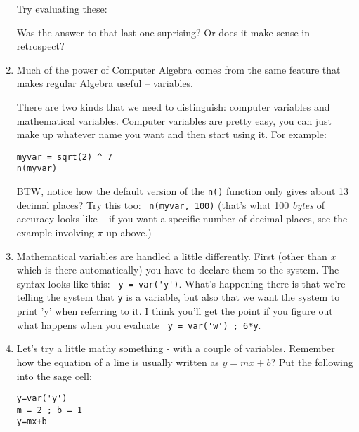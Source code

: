 \begin{enumerate}
	\noindent Try evaluating these:
    \begin{enumerate}
		\item \verb% sqrt(2) ^ 2 %
		\item \verb% sqrt(2) ^ 4 %
		\item \verb% sqrt(2) ^ 7 %
    \end{enumerate}

    \noindent Was the answer to that last one suprising?  Or does it make sense in retrospect?

    \item Much of the power of Computer Algebra comes from the same feature that makes regular Algebra useful -- variables.

    \noindent There are two kinds that we need to distinguish: computer variables and mathematical variables.  Computer variables are pretty easy, you can just make up whatever name you want and then start using it.  For example:

\begin{codeblock}
\begin{verbatim}
myvar = sqrt(2) ^ 7
n(myvar)
\end{verbatim}
\end{codeblock}

\noindent BTW, notice how the default version of the  {\tt n()} function only gives about 13 decimal places?  Try this too: \verb+ n(myvar, 100)+ (that's what 100 {\em bytes} of accuracy looks like -- if you want a specific number of decimal places, see the example involving $\pi$ up above.)

	\item Mathematical variables are handled a little differently.  First (other than $x$ which is there automatically) you have to declare them to the system.  The syntax looks like this: \verb+ y = var('y')+.  What's happening there is that we're telling the system that {\tt y} is a variable, but also that we want the system to print 'y' when referring to it.  I think you'll get the point if you figure out what happens when you evaluate \verb+ y = var('w') ; 6*y+.

	\item Let's try a little mathy something - with a couple of variables.  Remember how the equation of a line is usually written as $y = mx + b$?  Put the following into the sage cell:

\begin{codeblock}
\begin{verbatim}
y=var('y')
m = 2 ; b = 1
y=mx+b
\end{verbatim}
\end{codeblock}


\end{enumerate}

